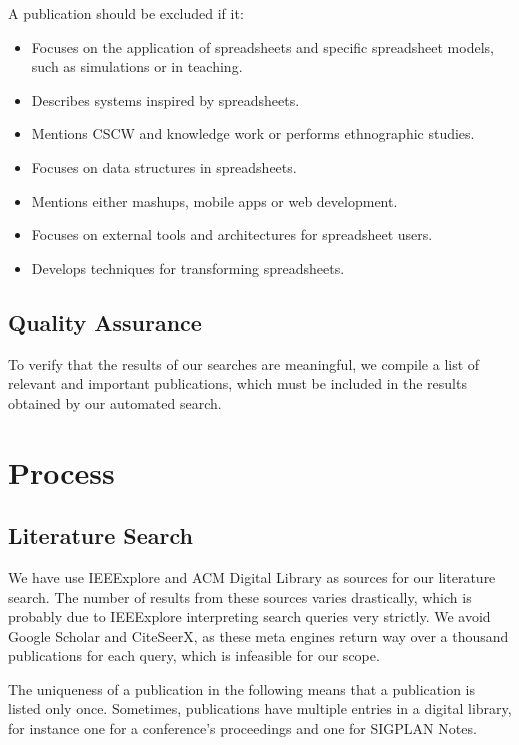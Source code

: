 \documentclass[a4paper]{article}
\begin{document}
A publication should be excluded if it:

\begin{itemize}
\item Focuses on the application of spreadsheets and specific
  spreadsheet models, such as simulations or in teaching.
\item Describes systems inspired by spreadsheets.
\item Mentions CSCW and knowledge work or performs ethnographic
  studies.
\item Focuses on data structures in spreadsheets.
\item Mentions either mashups, mobile apps or web development.
\item Focuses on external tools and architectures for spreadsheet
  users.
\item Develops techniques for transforming spreadsheets.
\end{itemize}

\subsection{Quality Assurance}
\label{sec:quality-assurance}

To verify that the results of our searches are meaningful, we compile
a list of relevant and important publications, which must be included
in the results obtained by our automated search.

\section{Process}
\label{sec:process}

\subsection{Literature Search}
\label{sec:literature-search}

We have use IEEExplore and ACM Digital Library as sources for our
literature search. The number of results from these sources varies
drastically, which is probably due to IEEExplore interpreting search
queries very strictly. We avoid Google Scholar and CiteSeerX, as these
meta engines return way over a thousand publications for each query,
which is infeasible for our scope.

The uniqueness of a publication in the following means that a
publication is listed only once. Sometimes, publications have multiple
entries in a digital library, for instance one for a conference's
proceedings and one for SIGPLAN Notes.
\end{document}
